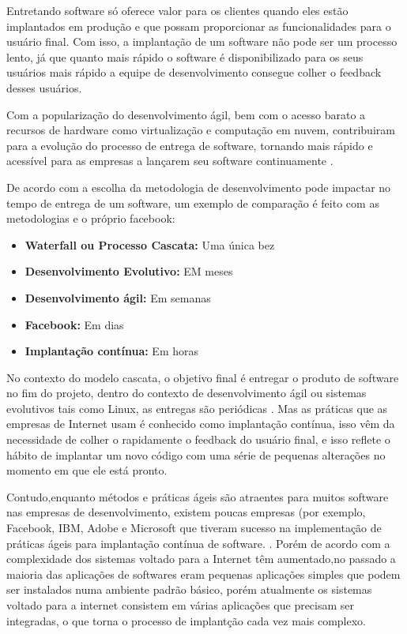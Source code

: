 \documentclass[12pt]{article}
\begin{document}
Entretando software só oferece valor para os clientes quando eles estão implantados em produção e que possam proporcionar as funcionalidades para o usuário final. \cite{6612879} Com isso, a implantação de um software não pode ser um processo lento, já que quanto mais rápido o software é disponibilizado para os seus usuários mais rápido a equipe de desenvolvimento consegue colher o feedback desses usuários.

Com a popularização do desenvolvimento ágil, bem com o acesso barato a recursos de hardware como virtualização e computação em nuvem, contribuiram para a evolução do processo de entrega de software, tornando mais rápido e acessível para as empresas a lançarem seu software continuamente \cite{6612879}.

De acordo com \cite{6449236} a escolha da metodologia de desenvolvimento pode impactar no tempo de entrega de um software, um exemplo de comparação é feito com as metodologias e o próprio facebook:

\begin{itemize}
  \item \textbf{Waterfall ou Processo Cascata:} Uma única bez
    \item \textbf{Desenvolvimento Evolutivo:} EM meses
    \item \textbf{Desenvolvimento ágil:} Em semanas
    \item \textbf{Facebook:} Em dias
    \item \textbf{Implantação contínua:} Em horas
\end{itemize}


No contexto do modelo cascata, o objetivo final é entregar o produto de software no fim do projeto, dentro do contexto de desenvolvimento ágil ou sistemas evolutivos tais como Linux, as entregas são periódicas \cite{6612879}. Mas as práticas que as empresas de Internet usam é conhecido como implantação contínua, isso vêm da necessidade de colher o rapidamente  o feedback do usuário final, e isso reflete o hábito de implantar um novo código com uma série de pequenas alterações no momento em que ele está pronto.

Contudo,enquanto métodos e práticas ágeis são atraentes para muitos software nas empresas de desenvolvimento, existem poucas empresas (por exemplo, Facebook, IBM, Adobe e Microsoft que tiveram sucesso na implementação de práticas ágeis para implantação contínua de software. \cite{Claps201521}. Porém de acordo com \cite{6265084} a complexidade dos sistemas voltado para a Internet têm aumentado,no passado a maioria das aplicações de softwares eram pequenas aplicações simples que podem ser instalados numa ambiente padrão básico, porém atualmente os sistemas voltado para a internet consistem em várias aplicações que precisam ser integradas, o que torna o processo de implantção cada vez mais complexo. \cite{6265084}
\end{document}
